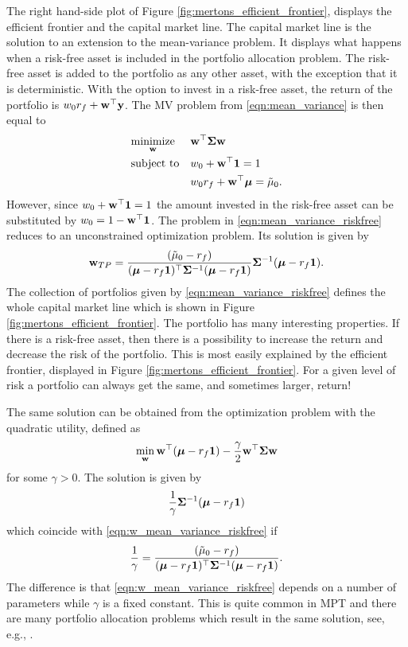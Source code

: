 \documentclass[12pt, oneside]{book}\usepackage{knitr}
\begin{document}
The right hand-side plot of Figure \ref{fig:mertons_efficient_frontier}, displays the efficient frontier and the capital market line.
The capital market line is the solution to an extension to the mean-variance problem.
It displays what happens when a risk-free asset is included in the portfolio allocation problem. 
The risk-free asset is added to the portfolio as any other asset, with the exception that it is deterministic.
With the option to invest in a risk-free asset, the return of the portfolio is $w_0 r_f + \mathbf{w}^\top \mathbf{y}$. 
The MV problem from \eqref{eqn:mean_variance} is then equal to
\begin{equation}\label{eqn:mean_variance_riskfree}
\begin{aligned}
& \underset{\mathbf{w}}{\text{minimize}} 
& & \mathbf{w}^\top \mathbf{\Sigma} \mathbf{w} \\
& \text{subject to}
& & w_0 + \mathbf{w}^\top \mathbf{1} = 1 \\
& && w_0 r_f + \mathbf{w}^\top \mbox{\boldmath$\mu$} = \tilde\mu_0. \\
\end{aligned}
\end{equation}
However, since $w_0 + \mathbf{w}^\top \mathbf{1}=1$ the amount invested in the risk-free asset can be substituted by $w_0=1-\mathbf{w}^\top \mathbf{1}$.
The problem in \eqref{eqn:mean_variance_riskfree} reduces to an unconstrained optimization problem. 
Its solution is given by 
\begin{equation}\label{eqn:w_mean_variance_riskfree}
  \mathbf{w}_{TP} = \frac{(\tilde\mu_0-r_f)}{(\mbox{\boldmath$\mu$}-r_f \mathbf{1})^\top \mathbf{\Sigma}^{-1} (\mbox{\boldmath$\mu$}-r_f \mathbf{1})} \mathbf{\Sigma}^{-1} (\mbox{\boldmath$\mu$}-r_f \mathbf{1}).
\end{equation}
The collection of portfolios given by \eqref{eqn:mean_variance_riskfree} defines the whole capital market line which is shown in Figure \ref{fig:mertons_efficient_frontier}. 
The portfolio has many interesting properties. 
If there is a risk-free asset, then there is a possibility to increase the return and decrease the risk of the portfolio. 
This is most easily explained by the efficient frontier, displayed in Figure \ref{fig:mertons_efficient_frontier}. 
For a given level of risk a portfolio can always get the same, and sometimes larger, return! 

The same solution can be obtained from the optimization problem with the quadratic utility, defined as 
$$\min_{\mathbf{w}} \mathbf{w}^\top (\mbox{\boldmath$\mu$}- r_f\mathbf{1}) - \frac{\gamma}{2} \mathbf{w}^\top \mathbf{\Sigma} \mathbf{w}$$ 
for some $\gamma > 0$.
The solution is given by 
\begin{equation}\label{eqn:TP_def}
  \frac{1}{\gamma}\mathbf{\Sigma}^{-1} (\mbox{\boldmath$\mu$}-r_f \mathbf{1})
\end{equation}
which coincide with \eqref{eqn:w_mean_variance_riskfree} if 
$$\frac{1}{\gamma} = \frac{(\tilde\mu_0-r_f)}{(\mbox{\boldmath$\mu$}-r_f \mathbf{1})^\top \mathbf{\Sigma}^{-1} (\mbox{\boldmath$\mu$}-r_f \mathbf{1})}.$$ 
The difference is that \eqref{eqn:w_mean_variance_riskfree} depends on a number of parameters while $\gamma$ is a fixed constant.
This is quite common in MPT and there are many portfolio allocation problems which result in the same solution, see, e.g., \citet{bodnar2013equivalence}.
\end{document}
